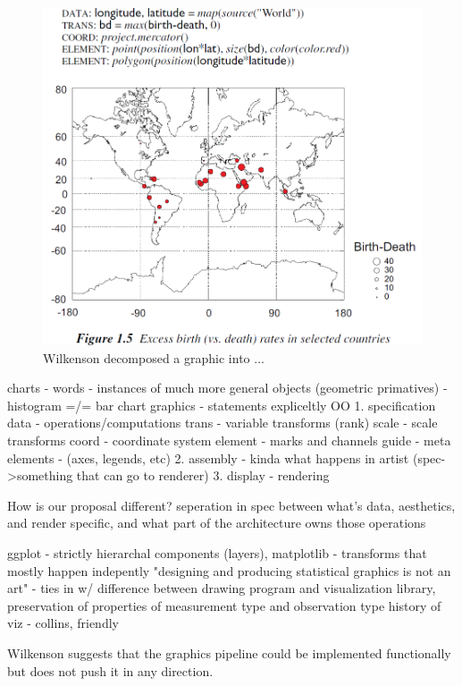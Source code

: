 \documentclass[letterpaper,onecolumn,titlepage]{Ythesis}
\begin{document}
\begin{figure}
    \includegraphics{figures/intro/grammar_example.png}
    \caption{Wilkenson decomposed a graphic into ...} 
\end{figure}

charts - words 
    - instances of much more general objects (geometric primatives)
    - histogram =/= bar chart
graphics - statements 
expliceltly OO
    1. specification
        data - operations/computations
        trans - variable transforms (rank)
        scale - scale transforms
        coord - coordinate system
        element - marks and channels
        guide - meta elements - (axes, legends, etc)
    2. assembly - kinda what happens in artist (spec->something that can go to renderer) 
    3. display - rendering

How is our proposal different? seperation in spec between what's data, aesthetics, and render specific, and what part of the architecture owns those operations


ggplot - strictly hierarchal components (layers), matplotlib - transforms that mostly happen indepently 
"designing and producing statistical graphics is not an art" - ties in w/ difference between drawing program and visualization library, preservation of properties of measurement type and observation type \cite{wickhamGgplot2ElegantGraphics2016a}
history of viz - collins, friendly


Wilkenson suggests that the graphics pipeline could be implemented functionally but does not push it in any direction. 
\end{document}
